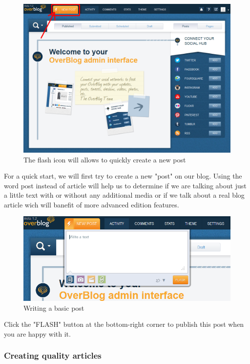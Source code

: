 \documentclass[a4paper,10pt]{article}
\begin{document}
\begin{figure}[H]
    \center
	\includegraphics[width=13cm]{Images/strike001.png}
    \caption{The flash icon will allows to quickly create a new post}
\end{figure}

For a quick start, we will first try to create a new "post" on our blog. Using the word post instead of article will help us to determine if we are talking about just a little text with or without any additional media or if we talk about a real blog article wich will banefit of more advanced edition features. 

\begin{figure}[H]
    \center
	\includegraphics[width=13cm]{Images/flash001.png}
    \caption{Writing a basic post}
\end{figure}

Click the "FLASH" button at the bottom-right corner to publish this post when you are happy with it. 

\newpage
\subsubsection{Creating quality articles}
\end{document}
